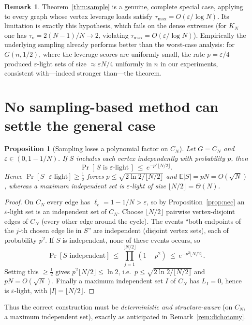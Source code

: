 \documentclass[12pt]{article}
\newcommand{\eps}{\varepsilon}
\newtheorem{proposition}{Proposition}
\theoremstyle{definition}
\newtheorem{remark}{Remark}
\begin{document}
\begin{remark}
Theorem~\ref{thm:sample} is a genuine, complete special case, applying to every
graph whose vertex leverage loads satisfy $\tau_{\max}=O(\eps/\log N)$. Its
limitation is exactly this hypothesis, which fails on the dense extremes (for
$K_N$ one has $\tau_v=2(N-1)/N\to2$, violating $\tau_{\max}=O(\eps/\log N)$).
Empirically the underlying sampling already performs better than the worst-case
analysis: for $G(n,1/2)$, where the leverage scores are uniformly small, the
rate $p=\eps/4$ produced $\eps$-light sets of size $\approx\eps N/4$ uniformly in
$n$ in our experiments, consistent with—indeed stronger than—the theorem.
\end{remark}

\section{No sampling-based method can settle the general case}

\begin{proposition}[Sampling loses a polynomial factor on $C_N$]\label{prop:loglb}
Let $G=C_N$ and $\eps\in(0,1-1/N)$. If $S$ includes each vertex independently
with probability $p$, then
\[
  \Pr[\,S\text{ is $\eps$-light}\,]\ \le\ e^{-p^2\lfloor N/2\rfloor}.
\]
Hence $\Pr[S\text{ $\eps$-light}]\ge\tfrac12$ forces $p\le\sqrt{2\ln2/\lfloor
N/2\rfloor}$ and $\mathbb E|S|=pN=O(\sqrt N)$, whereas a maximum independent set
is $\eps$-light of size $\lfloor N/2\rfloor=\Theta(N)$.
\end{proposition}

\begin{proof}
On $C_N$ every edge has $\ell_e=1-1/N>\eps$, so by Proposition~\ref{prop:nec} an
$\eps$-light set is an independent set of $C_N$. Choose
$\lfloor N/2\rfloor$ pairwise vertex-disjoint edges of $C_N$ (every other edge
around the cycle). The events ``both endpoints of the $j$-th chosen edge lie in
$S$'' are independent (disjoint vertex sets), each of probability $p^2$. If $S$
is independent, none of these events occurs, so
\[
  \Pr[S\text{ independent}]\ \le\ \prod_{j=1}^{\lfloor N/2\rfloor}(1-p^2)
  \ \le\ e^{-p^2\lfloor N/2\rfloor}.
\]
Setting this $\ge\tfrac12$ gives $p^2\lfloor N/2\rfloor\le\ln2$, i.e.\
$p\le\sqrt{2\ln2/\lfloor N/2\rfloor}$ and $pN=O(\sqrt N)$. Finally a maximum
independent set $I$ of $C_N$ has $L_I=0$, hence is $\eps$-light, with
$|I|=\lfloor N/2\rfloor$.
\end{proof}

Thus the correct construction must be \emph{deterministic and structure-aware}
(on $C_N$, a maximum independent set), exactly as anticipated in
Remark~\ref{rem:dichotomy}.
\end{document}
